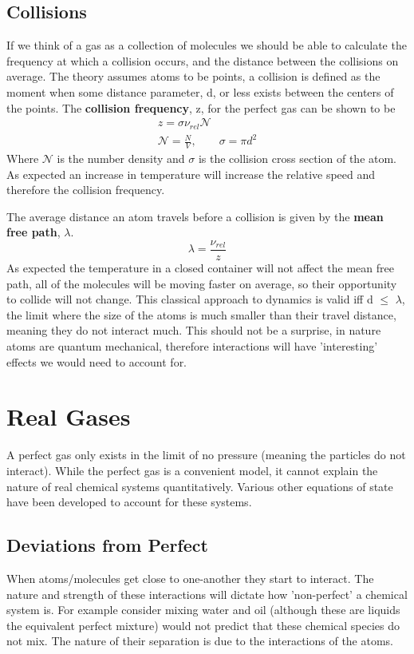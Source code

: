 \documentclass{article}
\newcommand{\be}{\begin{equation}}
\newcommand{\ee}{\end{equation}}
\begin{document}
\subsection*{Collisions}
If we think of a gas as a collection of molecules we should be able to calculate the frequency at which a collision occurs, and the distance between the collisions on average. 
The theory assumes atoms to be points, a collision is defined as the moment when some distance parameter, d, or less exists between the centers of the points. 
The \textbf{collision frequency}, z, for the perfect gas can be shown to be 
\be
\begin{split}
z = \sigma \nu_{rel}\mathcal{N}\\
\mathcal{N} = \frac{N}{V}, \qquad \sigma = \pi d^2
\end{split}
\ee
Where $\mathcal{N}$ is the number density and $\sigma$ is the collision cross section of the atom. 
As expected an increase in temperature will increase the relative speed and therefore the collision frequency. 

The average distance an atom travels before a collision is given by the \textbf{mean free path}, $\lambda$. 
\be
\lambda = \frac{\nu_{rel}}{z}
\ee
As expected the temperature in a closed container will not affect the mean free path, all of the molecules will be moving faster on average, so their opportunity to collide will not change. 
This classical approach to dynamics is valid iff d $\leq$ $\lambda$, the limit where the size of the atoms is much smaller than their travel distance, meaning they do not interact much. 
This should not be a surprise, in nature atoms are quantum mechanical, therefore interactions will have 'interesting' effects we would need to account for. 

\section*{Real Gases}
A perfect gas only exists in the limit of no pressure (meaning the particles do not interact). 
While the perfect gas is a convenient model, it cannot explain the nature of real chemical systems quantitatively. 
Various other equations of state have been developed to account for these systems. 

\subsection*{Deviations from Perfect}
When atoms/molecules get close to one-another they start to interact. 
The nature and strength of these interactions will dictate how 'non-perfect' a chemical system is. 
For example consider mixing water and oil (although these are liquids the equivalent perfect mixture) would not predict that these chemical species do not mix. 
The nature of their separation is due to the interactions of the atoms. 
\end{document}

